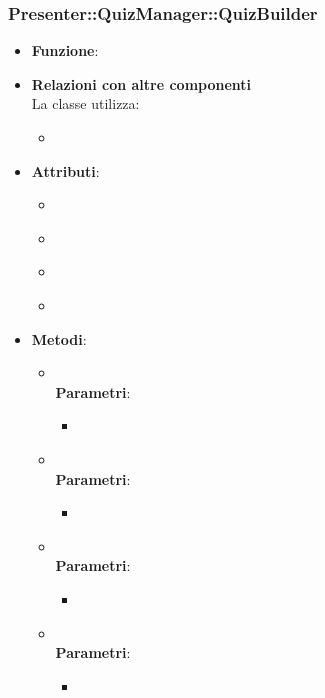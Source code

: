 \subsubsection{Presenter::QuizManager::QuizBuilder}
\begin{itemize}
\item\textbf{Funzione}:
\item\textbf{Relazioni con altre componenti}\\
La classe utilizza:
	\begin{itemize}
		\item
	\end{itemize}
\item\textbf{Attributi}:
	\begin{itemize}
		\item\code{}\\
		\item\code{}\\
		\item\code{}\\
		\item\code{}\\
	\end{itemize}
\item\textbf{Metodi}:
	\begin{itemize}
		\item\code{}\\
		\textbf{Parametri}:
			\begin{itemize}
				\item\code{}\\
			\end{itemize}
		\item\code{}\\
		\textbf{Parametri}:
			\begin{itemize}
				\item\code{}\\
			\end{itemize}
		\item\code{}\\
		\textbf{Parametri}:
			\begin{itemize}
				\item\code{}\\
			\end{itemize}
		\item\code{}\\
		\textbf{Parametri}:
			\begin{itemize}
				\item\code{}\\
			\end{itemize}
	\end{itemize}
\end{itemize}



